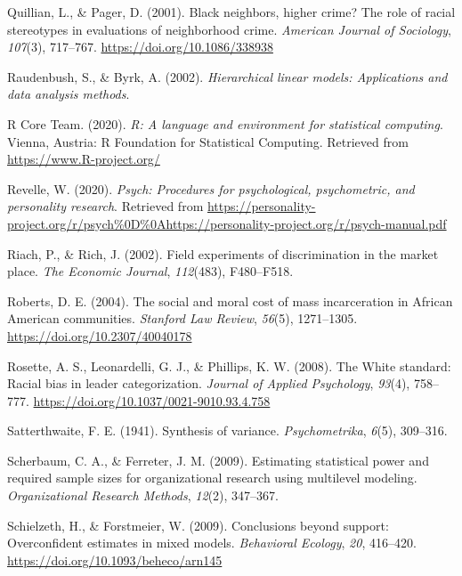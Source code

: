 \documentclass[
  english,
  man, noextraspace,floatsintext]{apa6}
\newlength{\cslhangindent}
\newenvironment{cslreferences}%
  {\setlength{\parindent}{0pt}%
  \everypar{\setlength{\hangindent}{\cslhangindent}}\ignorespaces}%
  {\par}
\begin{document}
\begin{cslreferences}
\leavevmode\hypertarget{ref-Quillian2001}{}%
Quillian, L., \& Pager, D. (2001). Black neighbors, higher crime? The role of racial stereotypes in evaluations of neighborhood crime. \emph{American Journal of Sociology}, \emph{107}(3), 717--767. \url{https://doi.org/10.1086/338938}

\leavevmode\hypertarget{ref-Raudenbush2002}{}%
Raudenbush, S., \& Byrk, A. (2002). \emph{Hierarchical linear models: Applications and data analysis methods}.

\leavevmode\hypertarget{ref-R-base}{}%
R Core Team. (2020). \emph{R: A language and environment for statistical computing}. Vienna, Austria: R Foundation for Statistical Computing. Retrieved from \url{https://www.R-project.org/}

\leavevmode\hypertarget{ref-R-psych}{}%
Revelle, W. (2020). \emph{Psych: Procedures for psychological, psychometric, and personality research}. Retrieved from \url{https://personality-project.org/r/psych\%0D\%0Ahttps://personality-project.org/r/psych-manual.pdf}

\leavevmode\hypertarget{ref-Riach2002}{}%
Riach, P., \& Rich, J. (2002). Field experiments of discrimination in the market place. \emph{The Economic Journal}, \emph{112}(483), F480--F518.

\leavevmode\hypertarget{ref-Roberts2004}{}%
Roberts, D. E. (2004). The social and moral cost of mass incarceration in African American communities. \emph{Stanford Law Review}, \emph{56}(5), 1271--1305. \url{https://doi.org/10.2307/40040178}

\leavevmode\hypertarget{ref-Rosette2008}{}%
Rosette, A. S., Leonardelli, G. J., \& Phillips, K. W. (2008). The White standard: Racial bias in leader categorization. \emph{Journal of Applied Psychology}, \emph{93}(4), 758--777. \url{https://doi.org/10.1037/0021-9010.93.4.758}

\leavevmode\hypertarget{ref-Satterthwaite1941}{}%
Satterthwaite, F. E. (1941). Synthesis of variance. \emph{Psychometrika}, \emph{6}(5), 309--316.

\leavevmode\hypertarget{ref-Scherbaum2009}{}%
Scherbaum, C. A., \& Ferreter, J. M. (2009). Estimating statistical power and required sample sizes for organizational research using multilevel modeling. \emph{Organizational Research Methods}, \emph{12}(2), 347--367.

\leavevmode\hypertarget{ref-Schielzeth2009}{}%
Schielzeth, H., \& Forstmeier, W. (2009). Conclusions beyond support: Overconfident estimates in mixed models. \emph{Behavioral Ecology}, \emph{20}, 416--420. \url{https://doi.org/10.1093/beheco/arn145}


\end{cslreferences}
\end{document}
